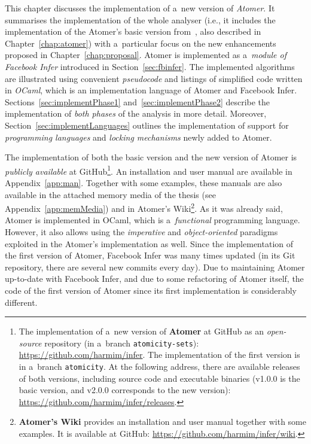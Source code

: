 This chapter discusses the implementation of a~new version of \emph{Atomer}. It summarises the implementation of the whole analyser (i.e., it includes the implementation of the Atomer's basic version from~\cite{harmimBP}, also described in Chapter~\ref{chap:atomer}) with a~particular focus on the new enhancements proposed in Chapter~\ref{chap:proposal}. Atomer is implemented as a~\emph{module of Facebook Infer} introduced in Section~\ref{sec:fbinfer}. The implemented algorithms are illustrated using convenient \emph{pseudocode} and listings of simplified code written in \emph{OCaml}, which is an implementation language of Atomer and Facebook Infer. Sections~\ref{sec:implementPhase1} and~\ref{sec:implementPhase2} describe the implementation of \emph{both phases} of the analysis in more detail. Moreover, Section~\ref{sec:implementLanguages} outlines the implementation of support for \emph{programming languages} and \emph{locking mechanisms} newly added to Atomer.

The implementation of both the basic version and the new version of Atomer is \emph{publicly available} at GitHub\footnote{The implementation of a~new version of \textbf{Atomer} at GitHub as an \emph{open-source} repository (in a~branch \texttt{atomicity-sets}): \url{https://github.com/harmim/infer}. The implementation of the first version is in a~branch \texttt{atomicity}. At the following address, there are available releases of both versions, including source code and executable binaries (v1.0.0 is the basic version, and v2.0.0 corresponds to the new version): \url{https://github.com/harmim/infer/releases}.}. An installation and user manual are available in Appendix~\ref{app:man}. Together with some examples, these manuals are also available in the attached memory media of the thesis (see Appendix~\ref{app:memMedia}) and in Atomer's Wiki\footnote{\textbf{Atomer's Wiki} provides an installation and user manual together with some examples. It is available at GitHub: \url{https://github.com/harmim/infer/wiki}.}. As it was already said, Atomer is implemented in OCaml, which is a~\emph{functional} programming language. However, it also allows using the \emph{imperative} and \emph{object-oriented} paradigms exploited in the Atomer's implementation as well. Since the implementation of the first version of Atomer, Facebook Infer was many times updated (in its Git repository, there are several new commits every day). Due to maintaining Atomer up-to-date with Facebook Infer, and due to some refactoring of Atomer itself, the code of the first version of Atomer since its first implementation is considerably different. 

